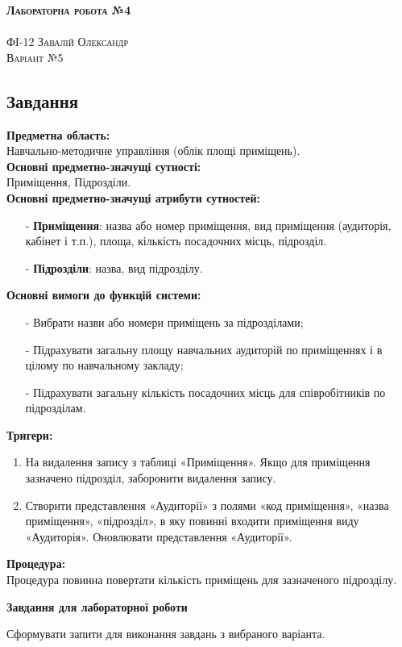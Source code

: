 \documentclass[a4paper,12pt]{article}
\begin{document}
	
	\begin{center}
		{\Large \bfseries \textsc{Лабораторна робота №4}}\\
		\hrulefill\\
		\Large \textsc{ФІ-12 Завалій Олександр\\ Варіант №5}
	\end{center}
	\begin{center}
		\section*{\bfseries{Завдання}}
	\end{center} 
	\textbf{Предметна область:} \\
	Навчально-методичне управління (облік площі приміщень). \\
	\textbf{Основні предметно-значущі сутності:} \\
	Приміщення, Підрозділи. \\
	\textbf{Основні предметно-значущі атрибути сутностей:}
	\begin{enumerate}
		\item[-] \textbf{Приміщення}: назва або номер приміщення, вид приміщення (аудиторія, кабінет і т.п.), площа, кількість посадочних місць, підрозділ. 
		\item[-] \textbf{Підрозділи}: назва, вид підрозділу.
	\end{enumerate}
	\textbf{Основні вимоги до функцій системи:}
	\begin{enumerate}
		\item[-] Вибрати назви або номери приміщень за підрозділами;
		\item[-] Підрахувати загальну площу навчальних аудиторій по приміщеннях і в цілому по навчальному закладу;
		\item[-] Підрахувати загальну кількість посадочних місць для співробітників по підрозділам.
	\end{enumerate}
	\textbf{Тригери:}
	\begin{enumerate}
		\item На видалення запису з таблиці «Приміщення». Якщо для приміщення зазначено підрозділ, заборонити видалення запису.
		\item Створити представлення «Аудиторії» з полями «код приміщення», «назва приміщення», «підрозділ», в яку повинні входити приміщення виду «Аудиторія». Оновлювати представлення «Аудиторії».
	\end{enumerate}
	\textbf{Процедура:}\\
	Процедура повинна повертати кількість приміщень для зазначеного підрозділу. \\
	\begin{center}
		\textbf{Завдання для лабораторної роботи}
	\end{center}
	Сформувати запити для виконання завдань з вибраного варіанта.
\end{document}
